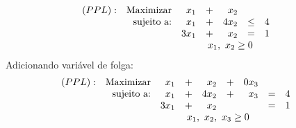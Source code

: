 \documentclass[12pt]{exam}
\begin{document}
\begin{questions}
\begin{solution}
	\begin{equation*}	
			\begin{array}{c r r c r c c c }
			(PPL) :& \text{Maximizar} & x_1  & + &  x_2    &  & &	\\
			           & \text{sujeito a:}  & x_1 & + & 4x_2  &  \leq  &	 4 \\
			           &                              & 3x_1 & + & x_2 &  = &	 1 \\
			           &                              & \multicolumn{6}{c}{x_1,~x_2 \geq 0}
			\end{array}	
	\end{equation*}
Adicionando variável de folga:
	\begin{equation*}	
			\begin{array}{c r r c r crc c c }
			(PPL) :& \text{Maximizar} & x_1   & + &  x_2   & + & 0x_3 &  & &	\\
			           & \text{sujeito a:}  & x_1   & + & 4x_2  & + &  x_3 &  =  &	 4 \\
			           &                              & 3x_1 & + & x_2    &     &        &  =  &	 1 \\
			           &                              & \multicolumn{6}{c}{x_1,~x_2,~x_3 \geq 0}
			\end{array}	
	\end{equation*}
	

\end{solution}
\end{questions}
\end{document}
